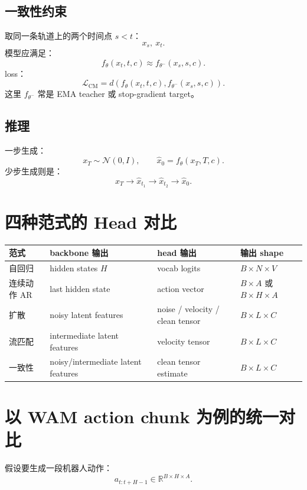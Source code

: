 \documentclass[11pt,a4paper]{ctexart}
\begin{document}
\subsection{一致性约束}

取同一条轨道上的两个时间点 \(s<t\)：
\[
  x_s,\ x_t.
\]
模型应满足：
\[
  f_\theta(x_t,t,c)
  \approx
  f_{\theta^-}(x_s,s,c).
\]
loss：
\[
  \mathcal{L}_{\mathrm{CM}}
  =
  d\left(
    f_\theta(x_t,t,c),
    f_{\theta^-}(x_s,s,c)
  \right).
\]
这里 \(f_{\theta^-}\) 常是 EMA teacher 或 stop-gradient target。

\subsection{推理}

一步生成：
\[
  x_T\sim\mathcal{N}(0,I),
  \qquad
  \hat{x}_0=f_\theta(x_T,T,c).
\]
少步生成则是：
\[
  x_T\rightarrow \hat{x}_{t_1}\rightarrow \hat{x}_{t_2}\rightarrow \hat{x}_0.
\]

\section{四种范式的 Head 对比}

\begin{center}
\begin{tabular}{llll}
\toprule
范式 & backbone 输出 & head 输出 & 输出 shape \\
\midrule
自回归 & hidden states \(H\) & vocab logits & \(B\times N\times V\) \\
连续动作 AR & last hidden state & action vector & \(B\times A\) 或 \(B\times H\times A\) \\
扩散 & noisy latent features & noise / velocity / clean tensor & \(B\times L\times C\) \\
流匹配 & intermediate latent features & velocity tensor & \(B\times L\times C\) \\
一致性 & noisy/intermediate latent features & clean tensor estimate & \(B\times L\times C\) \\
\bottomrule
\end{tabular}
\end{center}

\section{以 WAM action chunk 为例的统一对比}

假设要生成一段机器人动作：
\[
  a_{t:t+H-1}\in\mathbb{R}^{B\times H\times A}.
\]
\end{document}
